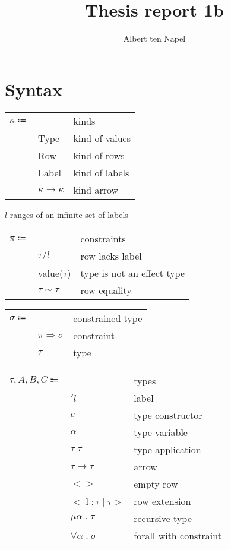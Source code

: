 \documentclass[12pt]{article}
\title{Thesis report 1b}
\author{Albert ten Napel}
\date{}
\begin{document}
\section{Syntax}

\begin{tabular}{l l l}
	$\kappa \Coloneqq$ & & kinds \\
		& Type & kind of values \\
		& Row & kind of rows \\
		& Label & kind of labels \\
		& $\kappa \rightarrow \kappa$ & kind arrow \\
\end{tabular}

\vspace{15pt}\noindent
$l$ ranges of an infinite set of labels \\

\vspace{15pt}\noindent
\begin{tabular}{l l l}
	$\pi \Coloneqq$ & & constraints \\
		& $\tau / l$ & row lacks label \\
		& value($\tau$) & type is not an effect type \\
		& $\tau \sim \tau$ & row equality \\
\end{tabular}

\vspace{15pt}\noindent
\begin{tabular}{l l l}
	$\sigma \Coloneqq$ & & constrained type \\
		& $\pi \Rightarrow \sigma$ & constraint \\
		& $\tau$ & type \\
\end{tabular}

\vspace{15pt}\noindent
\begin{tabular}{l l l}
	$\tau, A, B, C \Coloneqq$ & & types \\
		& $'l$ & label \\
		& $c$ & type constructor \\
		& $\alpha$ & type variable\\
		& $\tau \; \tau$ & type application \\
		& $\tau \rightarrow \tau$ & arrow \\
		& $<>$ & empty row \\ 
		& $< \; $l$ \; : \tau \; | \; \tau >$ & row extension \\
		& $\mu \alpha \; . \; \tau$ & recursive type \\
		& $\forall \alpha \; . \; \sigma$ & forall with constraint \\
\end{tabular}
\end{document}
